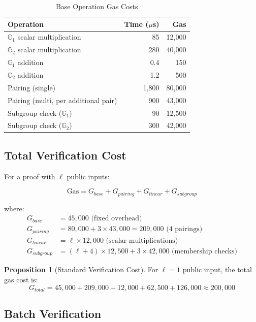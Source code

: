 \documentclass[11pt,a4paper]{article}
\theoremstyle{definition}
\newtheorem{proposition}{Proposition}
\begin{document}
\begin{table}[h]
\centering
\caption{Base Operation Gas Costs}
\begin{tabular}{lrr}
\toprule
Operation & Time ($\mu$s) & Gas \\
\midrule
$\mathbb{G}_1$ scalar multiplication & 85 & 12,000 \\
$\mathbb{G}_2$ scalar multiplication & 280 & 40,000 \\
$\mathbb{G}_1$ addition & 0.4 & 150 \\
$\mathbb{G}_2$ addition & 1.2 & 500 \\
Pairing (single) & 1,800 & 80,000 \\
Pairing (multi, per additional pair) & 900 & 43,000 \\
Subgroup check ($\mathbb{G}_1$) & 90 & 12,500 \\
Subgroup check ($\mathbb{G}_2$) & 300 & 42,000 \\
\bottomrule
\end{tabular}
\end{table}

\subsection{Total Verification Cost}

For a proof with $\ell$ public inputs:

\begin{equation}
\text{Gas} = G_{base} + G_{pairing} + G_{linear} + G_{subgroup}
\end{equation}

where:
\begin{align}
    G_{base} &= 45,000 \text{ (fixed overhead)} \\
    G_{pairing} &= 80,000 + 3 \times 43,000 = 209,000 \text{ (4 pairings)} \\
    G_{linear} &= \ell \times 12,000 \text{ (scalar multiplications)} \\
    G_{subgroup} &= (\ell + 4) \times 12,500 + 3 \times 42,000 \text{ (membership checks)}
\end{align}

\begin{proposition}[Standard Verification Cost]
    For $\ell = 1$ public input, the total gas cost is:
    \[
    G_{total} = 45,000 + 209,000 + 12,000 + 62,500 + 126,000 \approx 200,000
    \]
\end{proposition}

\subsection{Batch Verification}
\end{document}
